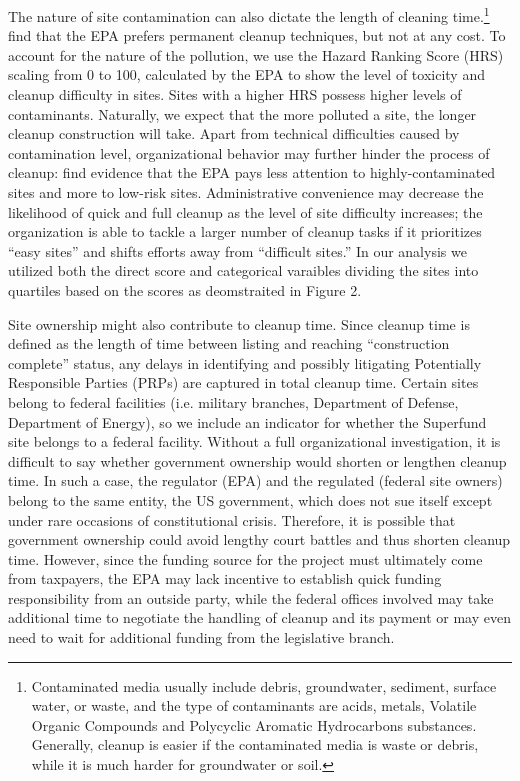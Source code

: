 \documentclass[12pt]{article}
\begin{document}
{The nature of site contamination can also dictate the length of cleaning time.\footnote{Contaminated media usually include debris, groundwater, sediment, surface water, or waste, and the type of contaminants are acids, metals, Volatile Organic Compounds and Polycyclic Aromatic Hydrocarbons substances. Generally, cleanup is easier if the contaminated media is waste or debris, while it is much harder for groundwater or soil.} \textcite{Gupta1996} find that the EPA prefers permanent cleanup techniques, but not at any cost. To account for the nature of the pollution, we use the Hazard Ranking Score (HRS) scaling from 0 to 100, calculated by the EPA to show the level of toxicity and cleanup difficulty in sites. Sites with a higher HRS possess higher levels of contaminants. Naturally, we expect that the more polluted a site, the longer cleanup construction will take. Apart from technical difficulties caused by contamination level, organizational behavior may further hinder the process of cleanup: \textcite{daley2004policy} find evidence that the EPA pays less attention to highly-contaminated sites and more to low-risk sites. Administrative convenience may decrease the likelihood of quick and full cleanup as the level of site difficulty increases; the organization is able to tackle a larger number of cleanup tasks if it prioritizes ``easy sites'' and shifts efforts away from ``difficult sites.'' In our analysis we utilized both the direct score and categorical varaibles dividing the sites into quartiles based on the scores as deomstraited in Figure 2.

Site ownership might also contribute to cleanup time. Since cleanup time is defined as the length of time between listing and reaching ``construction complete'' status, any delays in identifying and possibly litigating Potentially Responsible Parties (PRPs) are captured in total cleanup time. Certain sites belong to federal facilities (i.e. military branches, Department of Defense, Department of Energy), so we include an indicator for whether the Superfund site belongs to a federal facility. Without a full organizational investigation, it is difficult to say whether government ownership would shorten or lengthen cleanup time. In such a case, the regulator (EPA) and the regulated (federal site owners) belong to the same entity, the US government, which does not sue itself except under rare occasions of constitutional crisis. Therefore, it is possible that government ownership could avoid lengthy court battles and thus shorten cleanup time. However, since the funding source for the project must ultimately come from taxpayers, the EPA may lack incentive to establish quick funding responsibility from an outside party, while the federal offices involved may take additional time to negotiate the handling of cleanup and its payment or may even need to wait for additional funding from the legislative branch. 

}
\end{document}
